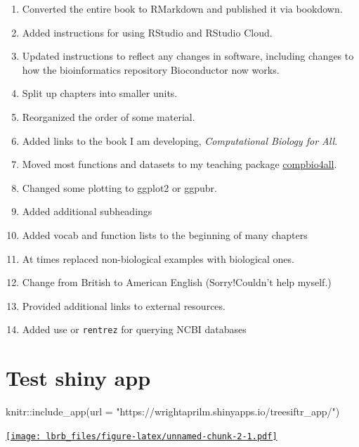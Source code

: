\documentclass[
]{book}
\newenvironment{Shaded}{\begin{snugshade}}{\end{snugshade}}
\newcommand{\AttributeTok}[1]{\textcolor[rgb]{0.77,0.63,0.00}{#1}}
\newcommand{\FunctionTok}[1]{\textcolor[rgb]{0.00,0.00,0.00}{#1}}
\newcommand{\NormalTok}[1]{#1}
\newcommand{\SpecialCharTok}[1]{\textcolor[rgb]{0.00,0.00,0.00}{#1}}
\newcommand{\StringTok}[1]{\textcolor[rgb]{0.31,0.60,0.02}{#1}}
\providecommand{\tightlist}{%
  \setlength{\itemsep}{0pt}\setlength{\parskip}{0pt}}
\begin{document}
\begin{enumerate}
\def\labelenumi{\arabic{enumi}.}
\tightlist
\item
  Converted the entire book to RMarkdown and published it via bookdown.
\item
  Added instructions for using RStudio and RStudio Cloud.
\item
  Updated instructions to reflect any changes in software, including changes to how the bioinformatics repository Bioconductor now works.
\item
  Split up chapters into smaller units.
\item
  Reorganized the order of some material.
\item
  Added links to the book I am developing, \emph{Computational Biology for All}.
\item
  Moved most functions and datasets to my teaching package \href{https://github.com/brouwern/compbio4all}{compbio4all}.
\item
  Changed some plotting to ggplot2 or ggpubr.
\item
  Added additional subheadings
\item
  Added vocab and function lists to the beginning of many chapters
\item
  At times replaced non-biological examples with biological ones.
\item
  Change from British to American English (Sorry!Couldn't help myself.)
\item
  Provided additional links to external resources.
\item
  Added use or \texttt{rentrez} for querying NCBI databases
\end{enumerate}

\hypertarget{test-shiny-app}{%
\chapter{Test shiny app}\label{test-shiny-app}}

\begin{Shaded}
\begin{Highlighting}[]
\NormalTok{knitr}\SpecialCharTok{::}\FunctionTok{include\_app}\NormalTok{(}\AttributeTok{url =} \StringTok{"https://wrightaprilm.shinyapps.io/treesiftr\_app/"}\NormalTok{)}
\end{Highlighting}
\end{Shaded}

\href{https://wrightaprilm.shinyapps.io/treesiftr_app/}{\texttt{[image: lbrb\_files/figure-latex/unnamed-chunk-2-1.pdf]}}
\end{document}

